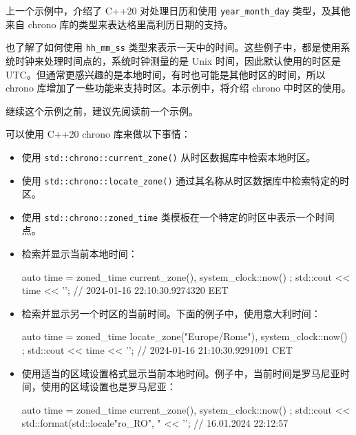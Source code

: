 上一个示例中，介绍了 C++20 对处理日历和使用 \verb|year_month_day| 类型，及其他来自 chrono 库的类型来表达格里高利历日期的支持。

也了解了如何使用 \verb|hh_mm_ss| 类型来表示一天中的时间。这些例子中，都是使用系统时钟来处理时间点的，系统时钟测量的是 Unix 时间，因此默认使用的时区是 UTC。但通常更感兴趣的是本地时间，有时也可能是其他时区的时间，所以 chrono 库增加了一些功能来支持时区。本示例中，将介绍 chrono 中时区的使用。


继续这个示例之前，建议先阅读前一个示例。


可以使用 C++20 chrono 库来做以下事情：

\begin{itemize}
\item
使用 \verb|std::chrono::current_zone()| 从时区数据库中检索本地时区。

\item
使用 \verb|std::chrono::locate_zone()| 通过其名称从时区数据库中检索特定的时区。

\item
使用 \verb|std::chrono::zoned_time| 类模板在一个特定的时区中表示一个时间点。

\item
检索并显示当前本地时间：

\begin{cpp}
auto time = zoned_time{ current_zone(), system_clock::now() };
std::cout << time << '\n'; // 2024-01-16 22:10:30.9274320 EET
\end{cpp}

\item
检索并显示另一个时区的当前时间。下面的例子中，使用意大利时间：

\begin{cpp}
auto time = zoned_time{ locate_zone("Europe/Rome"),
                        system_clock::now() };
std::cout << time << '\n'; // 2024-01-16 21:10:30.9291091 CET
\end{cpp}

\item
使用适当的区域设置格式显示当前本地时间。例子中，当前时间是罗马尼亚时间，使用的区域设置也是罗马尼亚：

\begin{cpp}
auto time = zoned_time{ current_zone(), system_clock::now() };
std::cout << std::format(std::locale{"ro_RO"}, "%
          << '\n'; // 16.01.2024 22:12:57
\end{cpp}


\end{itemize}
